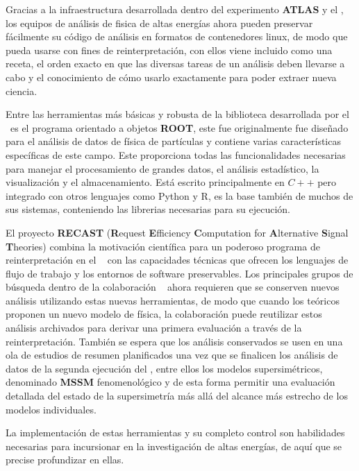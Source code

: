 
Gracias a la infraestructura desarrollada dentro del experimento \textbf{ATLAS} y el \CERN, los equipos de análisis de fisica de altas energías ahora pueden preservar fácilmente su código de análisis en formatos de contenedores linux, de modo que pueda usarse con fines de reinterpretación, con ellos viene incluido como una receta, el orden exacto en que las diversas tareas de un análisis deben llevarse a cabo y el conocimiento de cómo usarlo exactamente para poder extraer nueva ciencia.

Entre las herramientas más básicas y robusta de la biblioteca desarrollada por el \CERN ~es el programa orientado a objetos \textbf{ROOT}, este fue originalmente fue diseñado para el análisis de datos de física de partículas y contiene varias características específicas de este campo. Este proporciona todas las funcionalidades necesarias para manejar el procesamiento de grandes datos, el análisis estadístico, la visualización y el almacenamiento. Está escrito principalmente en $C++$ pero integrado con otros lenguajes como Python y R, es la base también de muchos de sus sistemas, conteniendo las librerias necesarias para su ejecución.

El proyecto \textbf{RECAST} (\textbf{R}equest \textbf{E}fficiency \textbf{C}omputation for \textbf{A}lternative \textbf{S}ignal \textbf{T}heories) combina la motivación científica para un poderoso programa de reinterpretación en el \LHC ~ con las capacidades técnicas que ofrecen los lenguajes de flujo de trabajo y los entornos de software preservables. Los principales grupos de búsqueda dentro de la colaboración \LHC~ ahora requieren que se conserven nuevos análisis utilizando estas nuevas herramientas, de modo que cuando los teóricos proponen un nuevo modelo de física, la colaboración puede reutilizar estos análisis archivados para derivar una primera evaluación a través de la reinterpretación. También se espera que los análisis conservados se usen en una ola de estudios de resumen planificados una vez que se finalicen los análisis de datos de la segunda ejecución del \LHC, entre ellos los modelos supersimétricos, denominado \textbf{MSSM} fenomenológico y de esta forma permitir una evaluación detallada del estado de la supersimetría más allá del alcance más estrecho de los modelos individuales. 

La implementación de estas herramientas y su completo control son habilidades necesarias para incursionar en la investigación de altas energías, de aquí que se precise profundizar en ellas.

